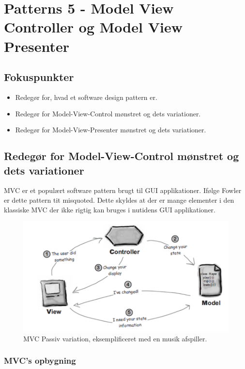 \section{Patterns 5 - Model View Controller og Model View Presenter}

\subsection{Fokuspunkter}

\begin{itemize}
	\item Redegør for, hvad et software design pattern er.
	\item Redegør for Model-View-Control mønstret og dets variationer.
	\item Redegør for Model-View-Presenter mønstret og dets variationer.
\end{itemize}



\subsection{Redegør for Model-View-Control mønstret og dets variationer}
MVC er et populært software pattern brugt til GUI applikationer. Ifølge Fowler er dette pattern tit misquoted. Dette skyldes at der er mange elementer i den klassiske MVC der ikke rigtig kan bruges i nutidens GUI applikationer.

\begin{figure}[H]
	\centering
	\includegraphics[width=0.8\linewidth]{figs/mvcExample}
	\caption{MVC Passiv variation, eksemplificeret med en musik afspiller.}
	\label{fig:mvcExample}
\end{figure}

\subsubsection{MVC's opbygning}

